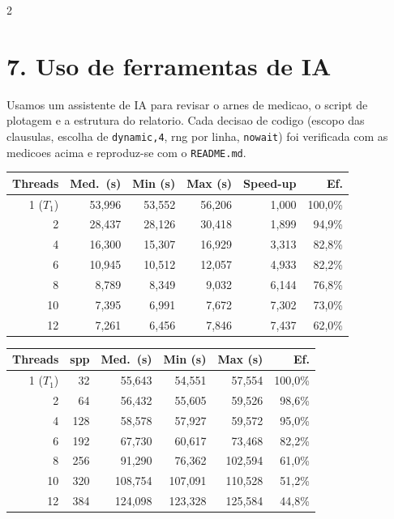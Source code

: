 \documentclass[10pt,a4paper]{article}
\begin{document}
\begin{multicols}{2}
\section*{7. Uso de ferramentas de IA}
Usamos um assistente de IA para revisar o arnes de medicao, o script de
plotagem e a estrutura do relatorio. Cada decisao de codigo (escopo das
clausulas, escolha de \texttt{dynamic,4}, rng por linha, \texttt{nowait})
foi verificada com as medicoes acima e reproduz-se com o \texttt{README.md}.

\end{multicols}

\begin{center}
  \small
  \label{tab:strong}
  \begin{tabular}{r r r r r r}
    \toprule
    Threads & Med.\ (s) & Min (s) & Max (s) & Speed-up & Ef. \\
    \midrule
    1 ($T_1$) & 53{,}996 & 53{,}552 & 56{,}206 & 1{,}000 & 100{,}0\% \\
    2  & 28{,}437 & 28{,}126 & 30{,}418 & 1{,}899 & 94{,}9\% \\
    4  & 16{,}300 & 15{,}307 & 16{,}929 & 3{,}313 & 82{,}8\% \\
    6  & 10{,}945 & 10{,}512 & 12{,}057 & 4{,}933 & 82{,}2\% \\
    8  &  8{,}789 &  8{,}349 &  9{,}032 & 6{,}144 & 76{,}8\% \\
    10 &  7{,}395 &  6{,}991 &  7{,}672 & 7{,}302 & 73{,}0\% \\
    12 &  7{,}261 &  6{,}456 &  7{,}846 & 7{,}437 & 62{,}0\% \\
    \bottomrule
  \end{tabular}
\end{center}

\begin{center}
  \small
  \label{tab:weak}
  \begin{tabular}{r r r r r r}
    \toprule
    Threads & spp & Med.\ (s) & Min (s) & Max (s) & Ef. \\
    \midrule
    1 ($T_1$) &  32 & 55{,}643 & 54{,}551 & 57{,}554 & 100{,}0\% \\
    2  &  64 & 56{,}432 & 55{,}605 & 59{,}526 & 98{,}6\% \\
    4  & 128 & 58{,}578 & 57{,}927 & 59{,}572 & 95{,}0\% \\
    6  & 192 & 67{,}730 & 60{,}617 & 73{,}468 & 82{,}2\% \\
    8  & 256 & 91{,}290 & 76{,}362 & 102{,}594 & 61{,}0\% \\
    10 & 320 & 108{,}754 & 107{,}091 & 110{,}528 & 51{,}2\% \\
    12 & 384 & 124{,}098 & 123{,}328 & 125{,}584 & 44{,}8\% \\
    \bottomrule
  \end{tabular}
\end{center}
\end{document}
